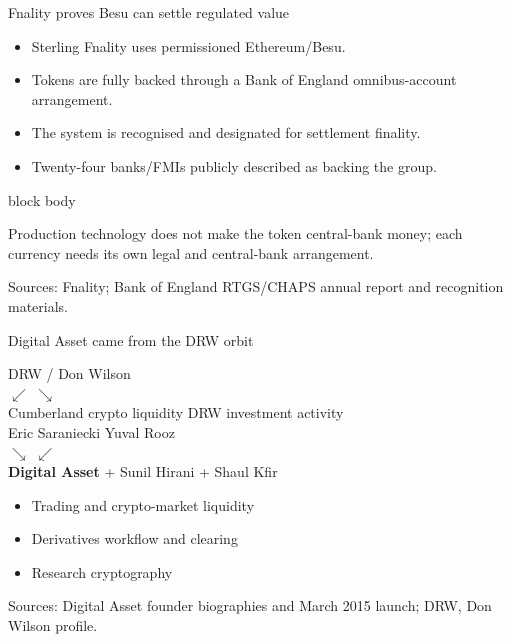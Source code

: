 \documentclass[aspectratio=169,12pt]{beamer}
\newcommand{\rust}[1]{\textcolor{Rust}{\textbf{#1}}}
\newcommand{\source}[1]{\vfill\par\fontsize{5.4}{6.5}\selectfont\color{Quiet}Sources: #1}
\newcommand{\tightitems}{\setlength{\itemsep}{0.42em}\setlength{\parskip}{0pt}}
\newcommand{\verytightitems}{\setlength{\itemsep}{0.22em}\setlength{\parskip}{0pt}}
\newenvironment{statement}{%
  \begin{beamercolorbox}[sep=.18cm,rounded=false,wd=\linewidth]{block body}%
  \fontsize{13}{15.5}\selectfont\bfseries
}{\end{beamercolorbox}}
\begin{document}
\begin{frame}{Fnality proves Besu can settle regulated value} %
  \begin{itemize}\tightitems
    \item Sterling Fnality uses permissioned Ethereum/Besu.
    \item Tokens are fully backed through a Bank of England omnibus-account arrangement.
    \item The system is recognised and designated for settlement finality.
    \item Twenty-four banks/FMIs publicly described as backing the group.
  \end{itemize}
  \begin{statement}
    Production technology does not make the token central-bank money; each currency needs its own legal and central-bank arrangement.
  \end{statement}
  \source{Fnality; Bank of England RTGS/CHAPS annual report and recognition materials.}
\end{frame}

\begin{frame}{Digital Asset came from the DRW orbit}
  \begin{center}
    \fontsize{11.5}{14}\selectfont
    DRW / Don Wilson \\
    \vspace{0.16cm}
    $\swarrow$ \hspace{2.2cm} $\searrow$ \\
    \vspace{0.12cm}
    Cumberland crypto liquidity \hspace{0.8cm} DRW investment activity \\
    \vspace{0.16cm}
    Eric Saraniecki \hspace{2.0cm} Yuval Rooz \\
    \vspace{0.23cm}
    $\searrow$ \hspace{2.0cm} $\swarrow$ \\
    \vspace{0.10cm}
    \rust{Digital Asset} \quad + \quad Sunil Hirani \quad + \quad Shaul Kfir
  \end{center}
  \vspace{0.25cm}
  \begin{itemize}\verytightitems
    \item Trading and crypto-market liquidity
    \item Derivatives workflow and clearing
    \item Research cryptography
  \end{itemize}
  \source{Digital Asset founder biographies and March 2015 launch; DRW, Don Wilson profile.}
\end{frame}
\end{document}
